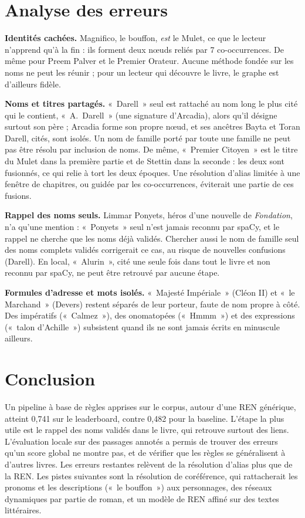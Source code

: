 \documentclass[cameraready]{Interspeech}
\begin{document}
\section{Analyse des erreurs}
\label{sec:erreurs}

\textbf{Identités cachées.} Magnifico, le bouffon, \emph{est} le Mulet, ce que le lecteur n'apprend qu'à la
fin : ils forment deux nœuds reliés par 7 co-occurrences. De même pour Preem Palver et le Premier Orateur. Aucune
méthode fondée sur les noms ne peut les réunir ; pour un lecteur qui découvre le livre, le graphe est d'ailleurs
fidèle.

\textbf{Noms et titres partagés.} «~Darell~» seul est rattaché au nom long le plus cité qui le contient,
«~A.~Darell~» (une signature d'Arcadia), alors qu'il désigne surtout son père ; Arcadia forme son propre nœud, et
ses ancêtres Bayta et Toran Darell, cités, sont isolés. Un nom de famille porté par toute une famille ne peut pas
être résolu par inclusion de noms. De même, «~Premier Citoyen~» est le titre du Mulet dans la première partie et
de Stettin dans la seconde : les deux sont fusionnés, ce qui relie à tort les deux époques. Une résolution d'alias
limitée à une fenêtre de chapitres, ou guidée par les co-occurrences, éviterait une partie de ces fusions.

\textbf{Rappel des noms seuls.} Limmar Ponyets, héros d'une nouvelle de \emph{Fondation}, n'a qu'une mention :
«~Ponyets~» seul n'est jamais reconnu par spaCy, et le rappel ne cherche que les noms déjà validés. Chercher aussi
le nom de famille seul des noms complets validés corrigerait ce cas, au risque de nouvelles confusions (Darell).
En local, «~Alurin~», cité une seule fois dans tout le livre et non reconnu par spaCy, ne peut être retrouvé par
aucune étape.

\textbf{Formules d'adresse et mots isolés.} «~Majesté Impériale~» (Cléon II) et «~le Marchand~» (Devers) restent
séparés de leur porteur, faute de nom propre à côté. Des impératifs («~Calmez~»), des onomatopées («~Hmmm~») et
des expressions («~talon d'Achille~») subsistent quand ils ne sont jamais écrits en minuscule ailleurs.

\section{Conclusion}

Un pipeline à base de règles apprises sur le corpus, autour d'une REN générique, atteint 0,741 sur le leaderboard,
contre 0,482 pour la baseline. L'étape la plus utile est le rappel des noms validés dans le livre, qui retrouve
surtout des liens. L'évaluation locale sur des passages annotés a permis de trouver des erreurs qu'un score global
ne montre pas, et de vérifier que les règles se généralisent à d'autres livres. Les erreurs restantes relèvent
de la résolution d'alias plus que de la REN. Les pistes suivantes sont la résolution de coréférence, qui
rattacherait les pronoms et les descriptions («~le bouffon~») aux personnages, des réseaux dynamiques par partie
de roman, et un modèle de REN affiné sur des textes littéraires.



\end{document}
